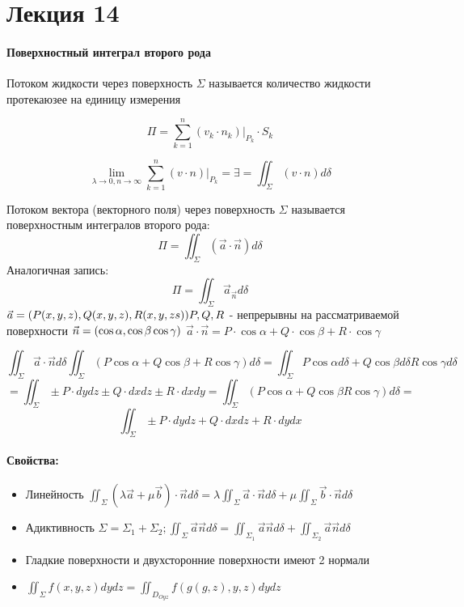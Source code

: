\chapter {Лекция 14}
\subsubsection{Поверхностный интеграл второго рода}
\begin{definition}[]
    Потоком жидкости через поверхность $\Sigma$ называется количество жидкости протекаюзее на единицу измерения 

    $$
    \Pi = \sum_{k=1}^n (v_k \cdot n_k) |_{P_k} \cdot S_k
    $$

    $$
        \lim_{\lambda \rightarrow 0, n \rightarrow \infty} \sum_{k=1}^n (v \cdot n) |_{P_k} = \exists = \iint_\Sigma (v \cdot n ) d\delta 
    $$
\end{definition}

\begin{definition}
    Потоком вектора (векторного поля) через поверхность $\Sigma$ называется поверхностным интегралов второго рода:
    $$
        \Pi = \iint_\Sigma (\vec{a}\cdot \vec{n}) d\delta 
    $$
    Аналогичная запись:
    $$
    \Pi = \iint_\Sigma \vec{a}_{\vec{n}} d\delta
    $$
    $
        \vec{a} = (P(x,y,z), Q(x,y,z), R(x,y,zs)) \\ 
        P, Q, R 
    $ - непрерывны на рассматриваемой поверхности 
    $ \\ \vec{n} = (\cos \alpha, \cos \beta \cos \gamma)$
    $\vec{a} \cdot \vec{n} = P \cdot \cos \alpha + Q\cdot\cos \beta + R\cdot\cos\gamma$

    $$
        \iint_\Sigma \vec{a}\cdot \vec{n} d\delta \iint_\Sigma (P\cos\alpha + Q\cos\beta + R\cos\gamma)d\delta = \iint_\Sigma P\cos\alpha d\delta + Q\cos\beta d\delta R\cos\gamma d\delta
    $$
    $$
        = \iint_\Sigma  \pm P \cdot dydz \pm Q \cdot dxdz \pm R \cdot dxdy = \iint_\Sigma ( P\cos \alpha + Q\cos\beta R\cos\gamma ) d\delta =
    $$
    $$
    \iint_\Sigma \pm P \cdot dydz + Q \cdot dxdz + R \cdot dydx
    $$
\end{definition}

\subsubsection{Свойства:}
\begin{itemize}
    \item Линейность $\iint_\Sigma (\lambda\vec{a} + \mu \vec{b}) \cdot \vec{n} d\delta = \lambda \iint_\Sigma \vec{a} \cdot \vec{n} d\delta + \mu \iint_\Sigma \vec{b}\cdot \vec{n} d\delta$
    \item Адиктивность $\Sigma = \Sigma_1 + \Sigma_2; \iint_\Sigma \vec{a}\vec{n}d\delta = \iint_{\Sigma_1}\vec{a}\vec{n}d\delta + \iint_{\Sigma_2}\vec{a}\vec{n} d\delta$
    \item Гладкие поверхности и двухсторонние поверхности имеют 2 нормали 
    \item $\iint_\Sigma f(x,y,z) dydz = \iint_{D_{Oyz}} f(g(g,z), y, z) dydz$
\end{itemize}


